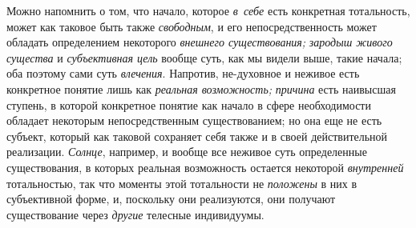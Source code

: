 Можно напомнить о том, что начало, которое {\em в~себе} есть
конкретная тотальность, может как таковое быть также {\em свободным}, и его
непосредственность может обладать определением некоторого
{\em внешнего существования;}
{\em зародыш живого существа} и {\em субъективная цель}
вообще суть, как мы видели выше, такие начала; оба поэтому
сами суть {\em влечения}.
Напротив, не-духовное и неживое есть конкретное понятие лишь
как {\em реальная возможность;} {\em причина} есть
наивысшая ступень, в которой конкретное понятие как начало в сфере
необходимости обладает некоторым непосредственным существованием; но она
еще не есть субъект, который как таковой сохраняет себя также и в своей
действительной реализации. {\em Солнце}, например, и
вообще все неживое суть определенные существования, в которых реальная
возможность остается некоторой {\em внутренней}
тотальностью, так что моменты этой тотальности не
{\em положены}
в них в субъективной форме, и, поскольку они реализуются, они
получают существование через {\em другие} телесные индивидуумы.


